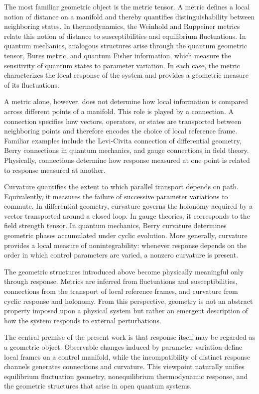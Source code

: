 The most familiar geometric object is the metric tensor.
A metric defines a local notion of distance on a manifold and
thereby quantifies distinguishability between neighboring
states. In thermodynamics, the Weinhold and Ruppeiner
metrics relate this notion of distance to susceptibilities and
equilibrium fluctuations. In quantum mechanics, analogous
structures arise through the quantum geometric tensor,
Bures metric, and quantum Fisher information, which
measure the sensitivity of quantum states to parameter
variation. In each case, the metric characterizes the local
response of the system and provides a geometric measure of
its fluctuations.

A metric alone, however, does not determine how local
information is compared across different points of a manifold.
This role is played by a connection. A connection specifies
how vectors, operators, or states are transported between
neighboring points and therefore encodes the choice of local
reference frame. Familiar examples include the Levi-Civita
connection of differential geometry, Berry connections in
quantum mechanics, and gauge connections in field theory.
Physically, connections determine how response measured at
one point is related to response measured at another.

Curvature quantifies the extent to which parallel transport
depends on path. Equivalently, it measures the failure of
successive parameter variations to commute. In differential
geometry, curvature governs the holonomy acquired by a
vector transported around a closed loop. In gauge theories,
it corresponds to the field strength tensor. In quantum
mechanics, Berry curvature determines geometric phases
accumulated under cyclic evolution. More generally,
curvature provides a local measure of nonintegrability:
whenever response depends on the order in which control
parameters are varied, a nonzero curvature is present.

The geometric structures introduced above become physically
meaningful only through response. Metrics are inferred from
fluctuations and susceptibilities, connections from the
transport of local reference frames, and curvature from
cyclic response and holonomy. From this perspective,
geometry is not an abstract property imposed upon a
physical system but rather an emergent description of how
the system responds to external perturbations.

The central premise of the present work is that response
itself may be regarded as a geometric object. Observable
changes induced by parameter variation define local frames
on a control manifold, while the incompatibility of distinct
response channels generates connections and curvature.
This viewpoint naturally unifies equilibrium fluctuation
geometry, nonequilibrium thermodynamic response, and
the geometric structures that arise in open quantum
systems.

